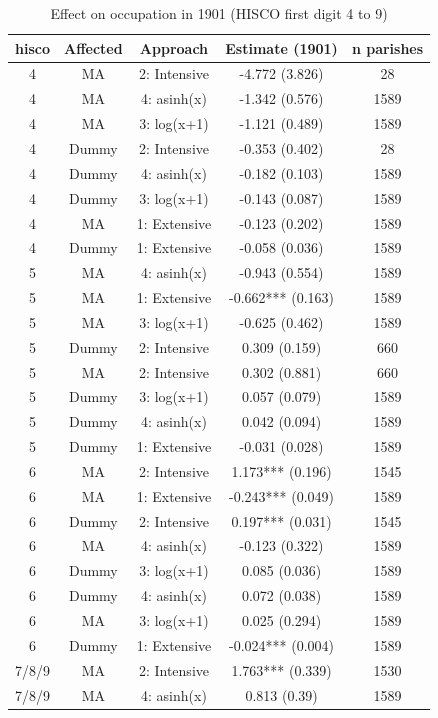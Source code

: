\begin{table}
    \centering
    \caption{Effect on occupation in 1901 (HISCO first digit 4 to 9)} \label{tab:occ2}
    \footnotesize
    \begin{tabular}{ccccc}
\toprule
hisco & Affected & Approach & Estimate (1901) & n parishes\\
\midrule
4 & MA & 2: Intensive & -4.772 (3.826) & 28\\
4 & MA & 4: asinh(x) & -1.342 (0.576) & 1589\\
4 & MA & 3: log(x+1) & -1.121 (0.489) & 1589\\
4 & Dummy & 2: Intensive & -0.353 (0.402) & 28\\
4 & Dummy & 4: asinh(x) & -0.182 (0.103) & 1589\\
4 & Dummy & 3: log(x+1) & -0.143 (0.087) & 1589\\
4 & MA & 1: Extensive & -0.123 (0.202) & 1589\\
4 & Dummy & 1: Extensive & -0.058 (0.036) & 1589\\
5 & MA & 4: asinh(x) & -0.943 (0.554) & 1589\\
5 & MA & 1: Extensive & -0.662*** (0.163) & 1589\\
5 & MA & 3: log(x+1) & -0.625 (0.462) & 1589\\
5 & Dummy & 2: Intensive & 0.309 (0.159) & 660\\
5 & MA & 2: Intensive & 0.302 (0.881) & 660\\
5 & Dummy & 3: log(x+1) & 0.057 (0.079) & 1589\\
5 & Dummy & 4: asinh(x) & 0.042 (0.094) & 1589\\
5 & Dummy & 1: Extensive & -0.031 (0.028) & 1589\\
6 & MA & 2: Intensive & 1.173*** (0.196) & 1545\\
6 & MA & 1: Extensive & -0.243*** (0.049) & 1589\\
6 & Dummy & 2: Intensive & 0.197*** (0.031) & 1545\\
6 & MA & 4: asinh(x) & -0.123 (0.322) & 1589\\
6 & Dummy & 3: log(x+1) & 0.085 (0.036) & 1589\\
6 & Dummy & 4: asinh(x) & 0.072 (0.038) & 1589\\
6 & MA & 3: log(x+1) & 0.025 (0.294) & 1589\\
6 & Dummy & 1: Extensive & -0.024*** (0.004) & 1589\\
7/8/9 & MA & 2: Intensive & 1.763*** (0.339) & 1530\\
7/8/9 & MA & 4: asinh(x) & 0.813 (0.39) & 1589\\

\end{tabular}
\end{table}
